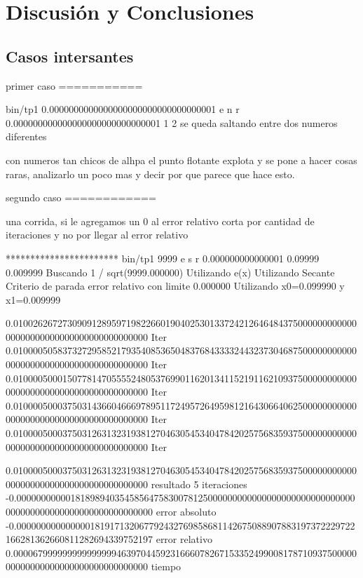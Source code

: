 \section{Discusión y Conclusiones}

\subsection{Casos intersantes}

primer caso
===========

bin/tp1 0.0000000000000000000000000000000001 e n r 0.000000000000000000000000000001 1 2
se queda saltando entre dos numeros diferentes

con numeros tan chicos de alhpa el punto flotante explota y se pone a hacer cosas raras, analizarlo un poco mas y decir por que parece que hace esto.


segundo caso
============

una corrida, si le agregamos un 0 al error relativo corta por cantidad de iteraciones y no por llegar al error relativo

*********************** bin/tp1 9999 e s r 0.000000000000001 0.09999 0.009999
Buscando 1 / sqrt(9999.000000)
Utilizando e(x)
Utilizando Secante
Criterio de parada error relativo con limite 0.000000
Utilizando x0=0.099990 y x1=0.009999

0.010026267273090912895971982266019040253013372421264648437500000000000000000000000000000000000000000 Iter
0.010000505837327295852179354085365048376843333244323730468750000000000000000000000000000000000000000 Iter
0.010000500015077814705555248053769901162013411521911621093750000000000000000000000000000000000000000 Iter
0.010000500037503143660466697895117249572649598121643066406250000000000000000000000000000000000000000 Iter
0.010000500037503126313231938127046305453404784202575683593750000000000000000000000000000000000000000 Iter

0.010000500037503126313231938127046305453404784202575683593750000000000000000000000000000000000000000 resultado
5 iteraciones
-0.000000000001818989403545856475830078125000000000000000000000000000000000000000000000000000000000000 error absoluto
-0.000000000000000181917132067792432769858681142675088907883197372229722166281362660811282694339752197 error relativo
0.000067999999999999999463970445923166607826715335249900817871093750000000000000000000000000000000000 tiempo

